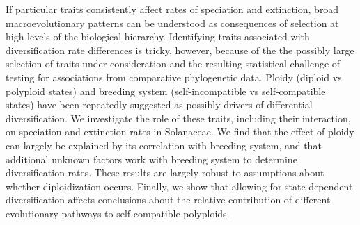 If particular traits consistently affect rates of speciation and extinction, broad macroevolutionary patterns can be understood as consequences of selection at high levels of the biological hierarchy.
Identifying traits associated with diversification rate differences is tricky, however, because of the the possibly large selection of traits under consideration and the resulting statistical challenge of testing for associations from comparative phylogenetic data.
Ploidy (diploid vs. polyploid states) and breeding system (self-incompatible vs self-compatible states) have been repeatedly suggested as possibly drivers of differential diversification.
We investigate the role of these traits, including their interaction, on speciation and extinction rates in Solanaceae.
We find that the effect of ploidy can largely be explained by its correlation with breeding system, and that additional unknown factors work with breeding system to determine diversification rates.
These results are largely robust to assumptions about whether diploidization occurs.
Finally, we show that allowing for state-dependent diversification affects conclusions about the relative contribution of different evolutionary pathways to self-compatible polyploids.
